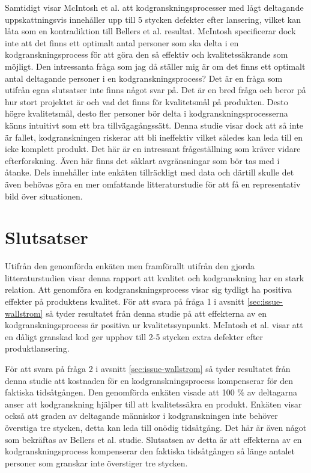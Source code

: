 Samtidigt visar McIntosh et al. \cite{mcintosh2014impact} att kodgranskningsprocesser med lågt deltagande uppskattningsvis innehåller upp till 5 stycken defekter efter lansering, vilket kan låta som en kontradiktion till Bellers et al. \cite{beller2014modern} resultat. McIntosh specificerar dock inte att det finns ett optimalt antal personer som ska delta i en kodgranskningsprocess för att göra den så effektiv och kvalitetssäkrande som möjligt. Den intressanta fråga som jag då ställer mig är om det finns ett optimalt antal deltagande personer i en kodgranskningsprocess? Det är en fråga som utifrån egna slutsatser inte finns något svar på. Det är en bred fråga och beror på hur stort projektet är och vad det finns för kvalitetsmål på produkten. Desto högre kvalitetsmål, desto fler personer bör delta i kodgranskningsprocesserna känns intuitivt som ett bra tillvägagångssätt. Denna studie visar dock att så inte är fallet, kodgranskningen riskerar att bli ineffektiv vilket således kan leda till en icke komplett produkt. Det här är en intressant frågeställning som kräver vidare efterforskning. Även här finns det såklart avgränsningar som bör tas med i åtanke. Dels innehåller inte enkäten tillräckligt med data och därtill skulle det även behövas göra en mer omfattande litteraturstudie för att få en representativ bild över situationen.

\section{Slutsatser}
\label{sec:conclusions-wallstrom}
Utifrån den genomförda enkäten men framförallt utifrån den gjorda litteraturstudien visar denna rapport att kvalitet och kodgranskning har en stark relation. Att genomföra en kodgranskningsprocess visar sig tydligt ha positiva effekter på produktens kvalitet. För att svara på fråga 1 i avsnitt \ref{sec:issue-wallstrom} så tyder resultatet från denna studie på att effekterna av en kodgranskningsprocess är positiva ur kvalitetssynpunkt. McIntosh et al. \cite{mcintosh2014impact} visar att en dåligt granskad kod ger upphov till 2-5 stycken extra defekter efter produktlansering.

För att svara på fråga 2 i avsnitt \ref{sec:issue-wallstrom} så tyder resultatet från denna studie att kostnaden för en kodgranskningsprocess kompenserar för den faktiska tidsåtgången. Den genomförda enkäten visade att 100 \% av deltagarna anser att kodgranskning hjälper till att kvalitetssäkra en produkt. Enkäten visar också att graden av deltagande människor i kodgranskningen inte behöver överstiga tre stycken, detta kan leda till onödig tidsåtgång. Det här är även något som bekräftas av Bellers et al. \cite{beller2014modern} studie. Slutsatsen av detta är att effekterna av en kodgranskningsprocess kompenserar den faktiska tidsåtgången så länge antalet personer som granskar inte överstiger tre stycken.


